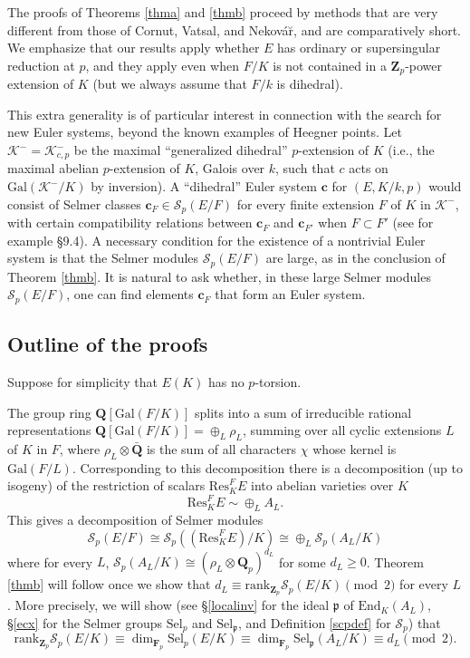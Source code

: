 \documentclass[reqno]{amsart}
\theoremstyle{definition}
\def\Z{\mathbf{Z}}
\def\Q{\mathbf{Q}}
\def\F{\mathbf{F}}
\def\Zp{\Z_p}
\def\Qp{\Q_p}
\def\Fp{\F_p}
\def\cS{\mathcal{S}}
\def\K{\mathcal{K}}
\def\P{\mathfrak{p}}
\def\Gal{\mathrm{Gal}}
\def\rk{\mathrm{rank}}
\def\Res{\mathrm{Res}}
\def\End{\mathrm{End}}
\def\Sel{\mathrm{Sel}}
\def\Scp{\cS_p}
\def\c{\mathbf{c}}
\def\k{k}
\def\Kantip{\K^-_{c,p}}
\begin{document}
The proofs of Theorems \ref{thma} and \ref{thmb} proceed by methods 
that are very different from those of Cornut, Vatsal, and Nekov\'a\u{r}, 
and are comparatively short.  We emphasize that our results 
apply whether $E$ has ordinary or supersingular reduction at $p$, and they apply 
even when $F/K$ is not contained in a $\Zp$-power extension of $K$ 
(but we always assume that $F/\k$ is dihedral).  

This extra generality is of particular interest in connection with 
the search for new Euler systems, beyond the known examples 
of Heegner points.  Let $\K^- = \Kantip$ be the maximal 
``generalized dihedral'' $p$-extension of $K$ (i.e., the maximal abelian 
$p$-extension of $K$, Galois over $\k$, such that $c$ acts on $\Gal(\K^-/K)$ 
by inversion).  
A ``dihedral'' Euler system $\c$ for $(E,K/\k,p)$ 
would consist of Selmer classes $\c_F \in \Scp(E/F)$ for every finite 
extension $F$ of $K$ in $\K^-$, with certain compatibility relations 
between $\c_F$ and $\c_{F'}$ when $F \subset F'$ 
(see for example \cite{EulerSystems} \S9.4).  
A necessary condition for the existence of a nontrivial 
Euler system is that the Selmer modules $\Scp(E/F)$ are large, 
as in the conclusion of Theorem \ref{thmb}.  
It is natural to ask whether, in these large Selmer modules $\Scp(E/F)$, 
one can find elements $\c_F$ that form an Euler system.

\subsection*{Outline of the proofs}  
Suppose for simplicity that $E(K)$ has no $p$-torsion.

The group ring $\Q[\Gal(F/K)]$ splits into a sum of irreducible rational 
representations $\Q[\Gal(F/K)] = \oplus_L \rho_L$, 
summing over all cyclic extensions $L$ of $K$ in $F$,
where $\rho_L \otimes \bar{\Q}$ is the sum of all characters $\chi$ whose 
kernel is $\Gal(F/L)$.  Corresponding to this decomposition there is a 
decomposition (up to isogeny) of the restriction of scalars $\Res^F_K E$ 
into abelian varieties over $K$ 
$$
\Res^F_K E \sim \oplus_{L}A_L.
$$
This gives a decomposition of Selmer modules
$$
\Scp(E/F) \cong \Scp((\Res^F_K E)/K) \cong \oplus_{L}\Scp(A_L/K)
$$
where for every $L$, $\Scp(A_L/K) \cong (\rho_L \otimes \Qp)^{d_L}$ for some $d_L \ge 0$.  
Theorem \ref{thmb} will follow once we show that 
$d_L \equiv \rk_{\Zp}\Scp(E/K) \pmod{2}$ for every $L$.
More precisely, we will show (see \S\ref{localinv} for the ideal $\P$ of $\End_K(A_L)$, 
\S\ref{ecx} for the Selmer groups $\Sel_p$ and $\Sel_\P$, 
and Definition \ref{scpdef} for $\Scp$) that
\begin{equation}
\label{sketch}
\rk_{\Zp}\Scp(E/K) \equiv \dim_{\Fp}\Sel_p(E/K) 
    \equiv \dim_{\Fp}\Sel_\P(A_L/K) 
    \equiv d_L \pmod{2}.
\end{equation}
\end{document}
